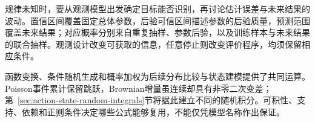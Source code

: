 规律未知时，要从观测模型出发确定目标能否识别，再讨论估计误差与未来结果的波动。置信区间覆盖固定总体参数，后验可信区间描述参数的后验质量，预测范围覆盖未来结果；对应概率分别来自重复抽样、参数后验，以及训练样本与未来结果的联合抽样。观测设计改变可获取的信息，任意停止则改变评价程序，均须保留相应条件。

函数变换、条件随机生成和概率加权为后续分布比较与状态建模提供了共同运算。Poisson事件累计保留跳跃，Brownian增量虽连续却具有非零二次变差；第~\ref{sec:action-state-random-integrals}节将据此建立不同的随机积分。可积性、支持、依赖和正则条件决定哪些公式能够复用，不能仅凭模型名称作出保证。
